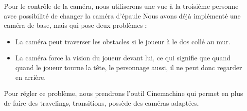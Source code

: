 \documentclass[../doc.tex]{subfiles}
\begin{document}
            Pour le contrôle de la caméra, nous utiliserons une vue à la troisième personne
            avec possibilité de changer la caméra d'épaule
            Nous avons déjà implémenté une caméra de base, mais qui pose deux problèmes :
            \begin{itemize}
                \item La caméra peut traverser les obstacles si le joueur à le dos collé au mur.
                \item La caméra force la vision du joueur devant lui, ce qui signifie que quand quand le joueur tourne la tête, le personnage aussi, il ne peut donc regarder en arrière. 
            \end{itemize}
            
            Pour régler ce problème, nous prendrons l'outil Cinemachine qui permet en plus de faire des travelings, transitions, possède des caméras adaptées.
\end{document}
